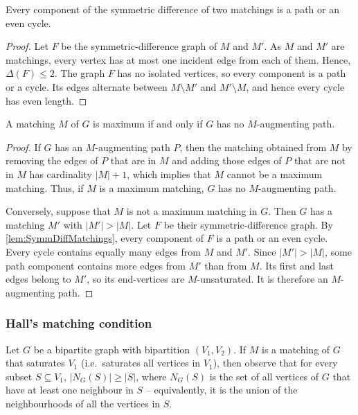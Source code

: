 \begin{Lemma}\label{lem:SymmDiffMatchings}
Every component of the symmetric difference of two matchings is a path or an even cycle.
\end{Lemma}

\begin{proof}
Let $F$ be the symmetric-difference graph of $M$ and $M'$. As $M$ and $M'$ are matchings, every vertex has at most one incident edge from each of them. Hence, $\Delta(F) \le 2$. The graph $F$ has no isolated vertices, so every component is a path or a cycle. Its edges alternate between $M \setminus M'$ and $M' \setminus M$, and hence every cycle has even length.
\end{proof}

\begin{Theorem}[Berge]
A matching $M$ of $G$ is maximum if and only if $G$ has no $M$-augmenting path.
\end{Theorem}

\begin{proof}
If $G$ has an $M$-augmenting path $P$, then the matching obtained from $M$ by removing the edges of $P$ that are in $M$ and adding those edges of $P$ that are not in $M$ has cardinality $|M| + 1$, which implies that $M$ cannot be a maximum matching. Thus, if $M$ is a maximum matching, $G$ has no $M$-augmenting path.

Conversely, suppose that $M$ is not a maximum matching in $G$. Then $G$ has a matching $M'$ with $|M'|>|M|$. Let $F$ be their symmetric-difference graph. By \cref{lem:SymmDiffMatchings}, every component of $F$ is a path or an even cycle. Every cycle contains equally many edges from $M$ and $M'$. Since $|M'|>|M|$, some path component contains more edges from $M'$ than from $M$. Its first and last edges belong to $M'$, so its end-vertices are $M$-unsaturated. It is therefore an $M$-augmenting path.
\end{proof}

\subsubsection{Hall's matching condition}\label{subsubsec:Hall}
Let $G$ be a bipartite graph with bipartition $(V_1, V_2)$. If $M$ is a matching of $G$ that saturates $V_1$ (i.e.\ saturates all vertices in $V_1$), then observe that for every subset $S \subseteq V_1$, $|N_G(S)| \ge |S|$, where $N_G(S)$ is the set of all vertices of $G$ that have at least one neighbour in $S$ -- equivalently, it is the union of the neighbourhoods of all the vertices in $S$.

